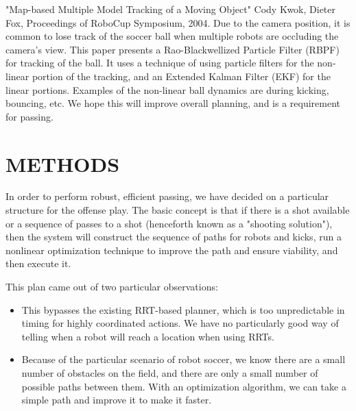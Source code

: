 \documentclass[a4paper, 10pt, conference]{ieeeconf}      %
\begin{document}
"Map-based Multiple Model Tracking of a Moving Object" Cody Kwok, Dieter Fox, Proceedings of RoboCup Symposium, 2004. Due to the camera position, it is common to lose track of the soccer ball when multiple robots are occluding the camera's view. This paper presents a Rao-Blackwellized Particle Filter (RBPF) for tracking of the ball. It uses a technique of using particle filters for the non-linear portion of the tracking, and an Extended Kalman Filter (EKF) for the linear portions. Examples of the non-linear ball dynamics are during kicking, bouncing, etc. We hope this will improve overall planning, and is a requirement for passing.

\section{METHODS}
In order to perform robust, efficient passing, we have decided on a particular structure for the offense play. The basic concept is that if there is a shot available or a sequence of passes to a shot (henceforth known as a "shooting solution"), then the system will construct the sequence of paths for robots and kicks, run a nonlinear optimization technique to improve the path and ensure viability, and then execute it.

This plan came out of two particular observations:

\begin{itemize}
 \item This bypasses the existing RRT-based planner, which is too unpredictable in timing for highly coordinated actions. We have no particularly good way of telling when a robot will reach a location when using RRTs.
 \item Because of the particular scenario of robot soccer, we know there are a small number of obstacles on the field, and there are only a small number of possible paths between them. With an optimization algorithm, we can take a simple path and improve it to make it faster.
\end{itemize}
\end{document}
